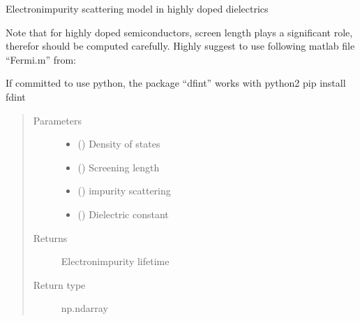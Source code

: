 \documentclass[letterpaper,10pt,english]{sphinxmanual}
\begin{document}
\begin{fulllineitems}
\label{\detokenize{autosummary/ThermoElectric.tau_strongly_screened_coulomb:ThermoElectric.tau_strongly_screened_coulomb}}
\sphinxAtStartPar
Electron\sphinxhyphen{}impurity scattering model in highly doped dielectrics

\sphinxAtStartPar
Note that for highly doped semiconductors, screen length plays a significant role,
therefor should be computed carefully. Highly suggest to use following matlab file “Fermi.m”
from: 

\sphinxAtStartPar
If committed to use python, the package “dfint” works with python2
pip install fdint
\begin{quote}\begin{description}
\item[{Parameters}] \leavevmode\begin{itemize}
\item {} 
\sphinxAtStartPar
{} () \textendash{} Density of states

\item {} 
\sphinxAtStartPar
{} () \textendash{} Screening length

\item {} 
\sphinxAtStartPar
{} () \textendash{} impurity scattering

\item {} 
\sphinxAtStartPar
{} () \textendash{} Dielectric constant

\end{itemize}

\item[{Returns}] \leavevmode
\sphinxAtStartPar
{} \textendash{} Electron\sphinxhyphen{}impurity lifetime

\item[{Return type}] \leavevmode
\sphinxAtStartPar
np.ndarray

\end{description}\end{quote}

\end{fulllineitems}
\end{document}
